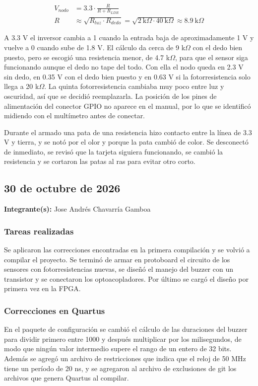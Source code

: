 \documentclass[11pt,letterpaper]{article}
\newcommand{\entrada}[2]{%
  \subsection*{#1}%
  \addcontentsline{toc}{subsection}{#1}%
  \noindent\textbf{Integrante(s):} #2\par\medskip
}
\begin{document}
\begin{align*}
V_{nodo} &= 3.3 \cdot \frac{R}{R + R_{LDR}} \\
R &\approx \sqrt{R_{luz} \cdot R_{dedo}} = \sqrt{2\ \text{k}\Omega \cdot 40\ \text{k}\Omega} \approx 8.9\ \text{k}\Omega
\end{align*}

A 3.3 V el inversor cambia a 1 cuando la entrada baja de aproximadamente 1 V y vuelve a 0 cuando sube de 1.8 V. El cálculo da cerca de 9 k$\Omega$ con el dedo bien puesto, pero se escogió una resistencia menor, de 4.7 k$\Omega$, para que el sensor siga funcionando aunque el dedo no tape del todo. Con ella el nodo queda en 2.3 V sin dedo, en 0.35 V con el dedo bien puesto y en 0.63 V si la fotorresistencia solo llega a 20 k$\Omega$. La quinta fotorresistencia cambiaba muy poco entre luz y oscuridad, así que se decidió reemplazarla. La posición de los pines de alimentación del conector GPIO no aparece en el manual, por lo que se identificó midiendo con el multímetro antes de conectar.

Durante el armado una pata de una resistencia hizo contacto entre la línea de 3.3 V y tierra, y se notó por el olor y porque la pata cambió de color. Se desconectó de inmediato, se revisó que la tarjeta siguiera funcionando, se cambió la resistencia y se cortaron las patas al ras para evitar otro corto.

\entrada{30 de octubre de 2026}{Jose Andrés Chavarría Gamboa}

\subsubsection*{Tareas realizadas}

Se aplicaron las correcciones encontradas en la primera compilación y se volvió a compilar el proyecto. Se terminó de armar en protoboard el circuito de los sensores con fotorresistencias nuevas, se diseñó el manejo del buzzer con un transistor y se conectaron los optoacopladores. Por último se cargó el diseño por primera vez en la FPGA.

\subsubsection*{Correcciones en Quartus}

En el paquete de configuración se cambió el cálculo de las duraciones del buzzer para dividir primero entre 1000 y después multiplicar por los milisegundos, de modo que ningún valor intermedio supere el rango de un entero de 32 bits. Además se agregó un archivo de restricciones que indica que el reloj de 50 MHz tiene un período de 20 ns, y se agregaron al archivo de exclusiones de git los archivos que genera Quartus al compilar.
\end{document}
